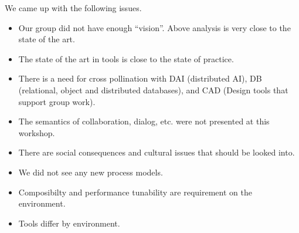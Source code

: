 We came up with the following issues.
\begin{itemize}
\item Our group did not have enough ``vision''.  Above analysis is very
  close to the state of the art.
\item The state of the art in tools is close to the state of practice.
\item There is a need for cross pollination with DAI (distributed AI), DB
(relational, object and distributed databases), and CAD (Design tools that
support group work).
\item The semantics of collaboration, dialog, etc. were not presented at
  this workshop.
\item There are social consequences and cultural issues that should be
  looked into.
\item We did not see any new process models.
\item Composibilty and performance tunability are requirement on the
  environment.
\item Tools differ by environment.
\end{itemize}



